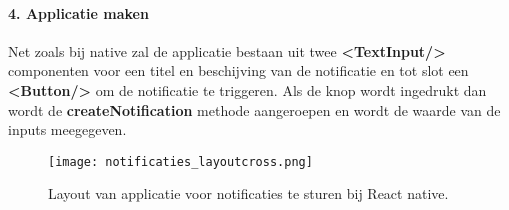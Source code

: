\paragraph{4. Applicatie maken}
Net zoals bij native zal de applicatie bestaan 
uit twee \textbf{<TextInput/>} componenten voor een titel en beschijving van de notificatie en tot slot een 
\textbf{<Button/>} om de notificatie te triggeren. Als de knop wordt ingedrukt dan wordt de 
\textbf{createNotification} methode aangeroepen en wordt de waarde van de inputs meegegeven.
\begin{figure}[H]
  \centering
  \texttt{[image: notificaties\_layoutcross.png]}
  \caption{Layout van applicatie voor notificaties te sturen bij React native.}
\end{figure}